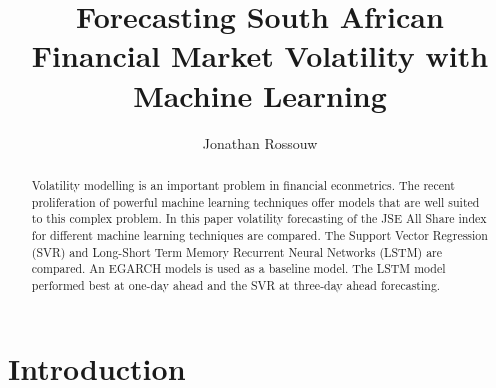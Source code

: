 \documentclass[11pt,preprint, authoryear]{elsarticle}
\numberwithin{equation}{section}
\numberwithin{figure}{section}
\numberwithin{table}{section}
\begin{document}
\begin{frontmatter}  %

\title{Forecasting South African Financial Market Volatility with
Machine Learning}





\author[Add1]{Jonathan Rossouw}







\begin{abstract}
\small{
Volatility modelling is an important problem in financial econmetrics.
The recent proliferation of powerful machine learning techniques offer
models that are well suited to this complex problem. In this paper
volatility forecasting of the JSE All Share index for different machine
learning techniques are compared. The Support Vector Regression (SVR)
and Long-Short Term Memory Recurrent Neural Networks (LSTM) are
compared. An EGARCH models is used as a baseline model. The LSTM model
performed best at one-day ahead and the SVR at three-day ahead
forecasting.
}
\end{abstract}

\vspace{1cm}





\vspace{0.5cm}

\end{frontmatter}



\pagestyle{fancy}
\chead{}
\rhead{}
\lfoot{}
\rfoot{}
\lhead{}
\cfoot{}


\headsep 35pt %




\hypertarget{introduction}{%
\section{\texorpdfstring{Introduction
\label{Introduction}}{Introduction }}\label{introduction}}
\end{document}
